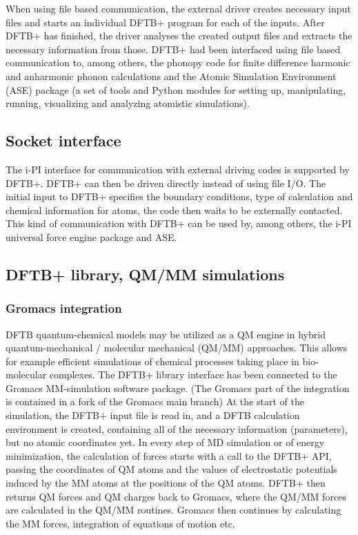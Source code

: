 \documentclass{revtex4-1}
\newcommand{\dftbp}{DFTB+}
\begin{document}
When using file based communication, the external driver creates necessary input
files and starts an individual \dftbp{} program for each of the
inputs. After \dftbp{} has finished, the driver analyses the created output
files and extracts the necessary information from those. \dftbp{} had been
interfaced using file based communication to, among others, the
phonopy\cite{phonopy} code for finite difference harmonic and anharmonic phonon
calculations and the Atomic Simulation Environment (ASE)
package\cite{larsen-jpcm-2017} (a set of tools and Python modules for setting
up, manipulating, running, visualizing and analyzing atomistic simulations).

\subsection{Socket interface}

The i-PI\cite{ipi} interface for communication with external driving codes is
supported by \dftbp{}. \dftbp{} can then be driven directly instead of
using file I/O. The initial input to \dftbp{} specifies the boundary conditions,
type of calculation and chemical information for atoms, the code then waits to
be externally contacted. This kind of communication with \dftbp{} can be used
by, among others, the i-PI universal force engine package\cite{ipi} and
ASE.\cite{larsen-jpcm-2017}


\subsection{\dftbp{} library, QM/MM simulations}

\subsubsection{Gromacs integration}

DFTB quantum-chemical models may be utilized as a QM engine in hybrid
quantum-mechanical / molecular mechanical (QM/MM) approaches.  This allows for
example efficient simulations of chemical processes taking place in bio-molecular
complexes.  The \dftbp{} library interface has been connected to the
Gromacs\cite{Gromacs7} MM-simulation software package. (The Gromacs part of the
integration is contained in a fork of the Gromacs main
branch\cite{gromacs-dftbplus-repo}) At the start of the simulation, the \dftbp{}
input file is read in, and a DFTB calculation environment is created, containing
all of the necessary information (parameters), but no atomic coordinates yet.
In every step of MD simulation or of energy minimization, the calculation of
forces starts with a call to the \dftbp{} API, passing the coordinates of QM
atoms and the values of electrostatic potentials induced by the MM atoms at the
positions of the QM atoms.  \dftbp{} then returns QM forces and QM charges back
to Gromacs, where the QM/MM forces are calculated in the QM/MM routines.
Gromacs then continues by calculating the MM forces, integration of equations of
motion etc.
\end{document}
